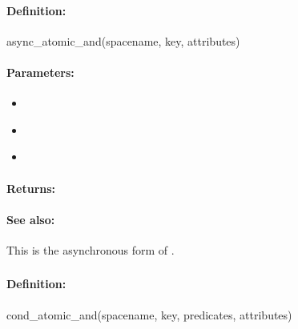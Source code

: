 \paragraph{Definition:}
\begin{rubycode}
async_atomic_and(spacename, key, attributes)
\end{rubycode}

\paragraph{Parameters:}
\begin{itemize}[noitemsep]
\item {}\\

\item {}\\

\item {}\\

\end{itemize}

\paragraph{Returns:}


\paragraph{See also:}  This is the asynchronous form of .

\pagebreak
\subsubsection{}
\label{api:ruby:cond_atomic_and}


\paragraph{Definition:}
\begin{rubycode}
cond_atomic_and(spacename, key, predicates, attributes)
\end{rubycode}

